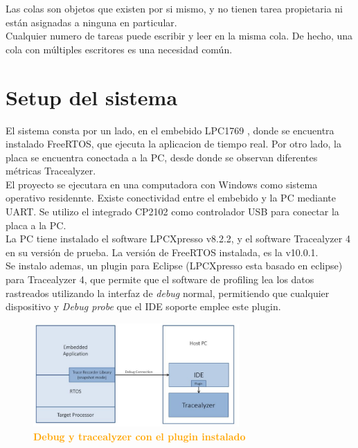\documentclass{article}
\begin{document}
Las colas son objetos que existen por si mismo, y no tienen tarea propietaria ni están asignadas a ninguna en particular.\\

Cualquier numero de tareas puede escribir y leer en la misma cola. De hecho, una cola con múltiples escritores es una necesidad común.\\

\section{Setup del sistema}

El sistema consta por un lado, en el embebido LPC1769 , donde se encuentra instalado FreeRTOS, que ejecuta la aplicacion de tiempo real. Por otro lado, la placa se encuentra conectada a la PC, desde donde se observan diferentes métricas Tracealyzer. \\

El proyecto se ejecutara en una computadora con Windows como sistema operativo residennte. Existe conectividad entre el embebido y la PC mediante UART. Se utilizo el integrado CP2102 como controlador USB para conectar la placa a la PC. \\

La PC tiene instalado el software LPCXpresso v8.2.2, y el software Tracealyzer 4 en su versión de prueba. La versión de FreeRTOS instalada, es la v10.0.1.\\

Se instalo ademas, un plugin para Eclipse (LPCXpresso esta basado en eclipse) para Tracealyzer 4, que permite que el software de profiling lea los datos rastreados utilizando la interfaz de \textit{debug} normal, permitiendo que cualquier dispositivo y \textit{Debug probe} que el IDE soporte emplee este plugin. \\

\begin{figure}[H]
   \centering
   \includegraphics[width=0.7\textwidth]{figures/plugin.jpg}
   \centering
   \caption{\textbf{\textcolor{Orange}{Debug y tracealyzer con el plugin instalado}}}
\end{figure}
\end{document}
